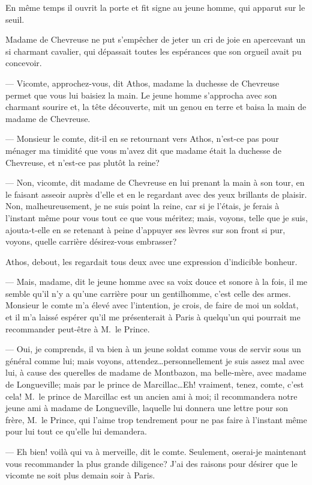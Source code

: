En même temps il ouvrit la porte et fit signe au jeune homme, qui apparut sur le seuil.

Madame de Chevreuse ne put s'empêcher de jeter un cri de joie en apercevant un si charmant cavalier, qui dépassait toutes les espérances que son orgueil avait pu concevoir.

— Vicomte, approchez-vous, dit Athos, madame la duchesse de Chevreuse permet que vous lui baisiez la main.
Le jeune homme s'approcha avec son charmant sourire et, la tête découverte, mit un genou en terre et baisa la main de madame de Chevreuse.

— Monsieur le comte, dit-il en se retournant vers Athos, n'est-ce pas pour ménager ma timidité que vous m'avez dit que madame était la duchesse de Chevreuse, et n'est-ce pas plutôt la reine?

— Non, vicomte, dit madame de Chevreuse en lui prenant la main à son tour, en le faisant asseoir auprès d'elle et en le regardant avec des yeux brillants de plaisir. Non, malheureusement, je ne suis point la reine, car si je l'étais, je ferais à l'instant même pour vous tout ce que vous méritez; mais, voyons, telle que je suis, ajouta-t-elle en se retenant à peine d'appuyer ses lèvres sur son front si pur, voyons, quelle carrière désirez-vous embrasser?

Athos, debout, les regardait tous deux avec une expression d'indicible bonheur.

— Mais, madame, dit le jeune homme avec sa voix douce et sonore à la fois, il me semble qu'il n'y a qu'une carrière pour un gentilhomme, c'est celle des armes. Monsieur le comte m'a élevé avec l'intention, je crois, de faire de moi un soldat, et il m'a laissé espérer qu'il me présenterait à Paris à quelqu'un qui pourrait me recommander peut-être à M.~le Prince.

— Oui, je comprends, il va bien à un jeune soldat comme vous de servir sous un général comme lui; mais voyons, attendez\dots personnellement je suis assez mal avec lui, à cause des querelles de madame de Montbazon, ma belle-mère, avec madame de Longueville; mais par le prince de Marcillac\dots Eh! vraiment, tenez, comte, c'est cela! M.~le prince de Marcillac est un ancien ami à moi; il recommandera notre jeune ami à madame de Longueville, laquelle lui donnera une lettre pour son frère, M.~le Prince, qui l'aime trop tendrement pour ne pas faire à l'instant même pour lui tout ce qu'elle lui demandera.

— Eh bien! voilà qui va à merveille, dit le comte. Seulement, oserai-je maintenant vous recommander la plus grande diligence? J'ai des raisons pour désirer que le vicomte ne soit plus demain soir à Paris.

